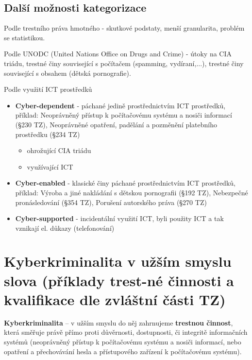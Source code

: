 \subsection{Další možnosti kategorizace}
Podle trestního práva hmotného - skutkové podstaty, menší granularita, problém se statistikou.

Podle UNODC (United Nations Office on Drugs and Crime) - útoky na CIA triádu, trestné činy související s počítačem (spamming, vydíraní,...), trestné činy související s obsahem (dětská pornografie).

Podle využití ICT prostředků
\begin{itemize}
    \item \textbf{Cyber-dependent} - páchané jedině prostřednictvím ICT prostředků, příklad: Neoprávněný přístup k počítačovému systému a nosiči informací (§230 TZ), Neoprávněné opatření, padělání a pozměnění platebního prostředku (§234 TZ)
    \begin{itemize}
        \item ohrožující CIA triádu
        \item využívající ICT
    \end{itemize}   
    \item \textbf{Cyber-enabled} - klasické činy páchané prostřednictvím ICT prostředků, příklad: Výroba a jiné nakládání s dětskou pornografii (§192 TZ), Nebezpečné pronásledování (§354 TZ), Porušení autorského práva (§270 TZ)
    \item \textbf{Cyber-supported} - incidentální využití ICT, byli použity ICT a tak vznikají el. důkazy (telefonování)
\end{itemize}

\newpage
\section[Kyberkriminalita v užším smyslu slova (příklady trestné činnosti a~kvalifikace dle zvláštní části TZ)]{Kyberkriminalita v užším smyslu slova (příklady trest-né činnosti a kvalifikace dle zvláštní části TZ)}
\textbf{Kyberkriminalita} -- v užším smyslu do něj zahrnujeme \textbf{trestnou činnost}, která směřuje právě přímo proti důvěrnosti, dostupnosti, či integritě informačních systémů (neoprávněný přístup k počítačovému systému a nosiči informací, nebo opatření a přechovávání hesla a přístupového zařízení k počítačovému systému).

